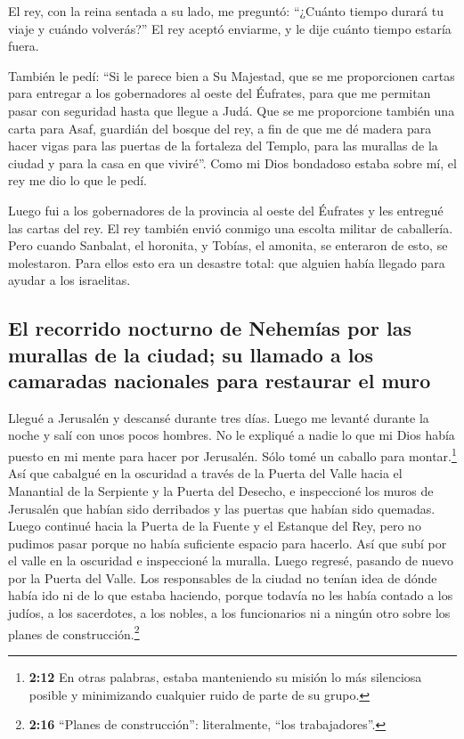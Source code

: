  El rey, con la reina sentada a su lado, me preguntó:
``¿Cuánto tiempo durará tu viaje y cuándo volverás?'' El rey aceptó
enviarme, y le dije cuánto tiempo estaría fuera.

 También le pedí: ``Si le parece bien a Su Majestad, que
se me proporcionen cartas para entregar a los gobernadores al oeste del
Éufrates, para que me permitan pasar con seguridad hasta que llegue a
Judá.  Que se me proporcione también una carta para Asaf,
guardián del bosque del rey, a fin de que me dé madera para hacer vigas
para las puertas de la fortaleza del Templo, para las murallas de la
ciudad y para la casa en que viviré''. Como mi Dios bondadoso estaba
sobre mí, el rey me dio lo que le pedí.

 Luego fui a los gobernadores de la provincia al oeste del
Éufrates y les entregué las cartas del rey. El rey también envió conmigo
una escolta militar de caballería.  Pero cuando Sanbalat,
el horonita, y Tobías, el amonita, se enteraron de esto, se molestaron.
Para ellos esto era un desastre total: que alguien había llegado para
ayudar a los israelitas.

\hypertarget{el-recorrido-nocturno-de-nehemuxedas-por-las-murallas-de-la-ciudad-su-llamado-a-los-camaradas-nacionales-para-restaurar-el-muro}{%
\subsection{El recorrido nocturno de Nehemías por las murallas de la
ciudad; su llamado a los camaradas nacionales para restaurar el
muro}\label{el-recorrido-nocturno-de-nehemuxedas-por-las-murallas-de-la-ciudad-su-llamado-a-los-camaradas-nacionales-para-restaurar-el-muro}}

 Llegué a Jerusalén y descansé durante tres días.
 Luego me levanté durante la noche y salí con unos pocos
hombres. No le expliqué a nadie lo que mi Dios había puesto en mi mente
para hacer por Jerusalén. Sólo tomé un caballo para montar.\footnote{\textbf{2:12}
  En otras palabras, estaba manteniendo su misión lo más silenciosa
  posible y minimizando cualquier ruido de parte de su grupo.}
 Así que cabalgué en la oscuridad a través de la Puerta
del Valle hacia el Manantial de la Serpiente y la Puerta del Desecho, e
inspeccioné los muros de Jerusalén que habían sido derribados y las
puertas que habían sido quemadas.  Luego continué hacia
la Puerta de la Fuente y el Estanque del Rey, pero no pudimos pasar
porque no había suficiente espacio para hacerlo.  Así que
subí por el valle en la oscuridad e inspeccioné la muralla. Luego
regresé, pasando de nuevo por la Puerta del Valle.  Los
responsables de la ciudad no tenían idea de dónde había ido ni de lo que
estaba haciendo, porque todavía no les había contado a los judíos, a los
sacerdotes, a los nobles, a los funcionarios ni a ningún otro sobre los
planes de construcción.\footnote{\textbf{2:16} ``Planes de
  construcción'': literalmente, ``los trabajadores''.}

